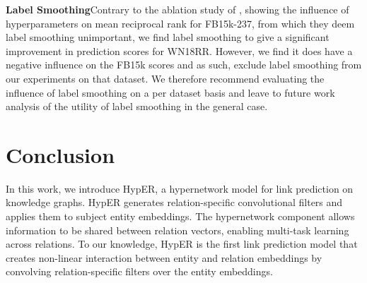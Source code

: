 \documentclass[runningheads]{llncs}
\newcommand{\keypoint}[1]{\vspace{0.1cm}\noindent\textbf{#1}\quad}
\begin{document}
\begin{table}[!htbp]
	\centering
	\caption{Influence of different filter dimension choices on prediction results.}
     \label{table:ablation}
 \end{table}

\keypoint{Label Smoothing}Contrary to the ablation study of \cite{dettmers2017convolutional}, showing the influence of hyperparameters on mean reciprocal rank for FB15k-237, from which they deem label smoothing unimportant, we find label smoothing to give a significant improvement in prediction scores for WN18RR. However, we find it does have a negative influence on the FB15k scores and as such, exclude label smoothing from our experiments on that dataset. We therefore recommend evaluating the influence of label smoothing on a per dataset basis and leave to future work analysis of the utility of label smoothing in the general case.

\section{Conclusion}
In this work, we introduce HypER, a hypernetwork model for link prediction on knowledge graphs. HypER generates relation-specific convolutional filters and applies them to subject entity embeddings. The hypernetwork component allows information to be shared between relation vectors, enabling multi-task learning across relations. To our knowledge, HypER is the first link prediction model that creates  non-linear interaction between entity and relation embeddings by convolving relation-specific filters over the entity embeddings. 
\end{document}
